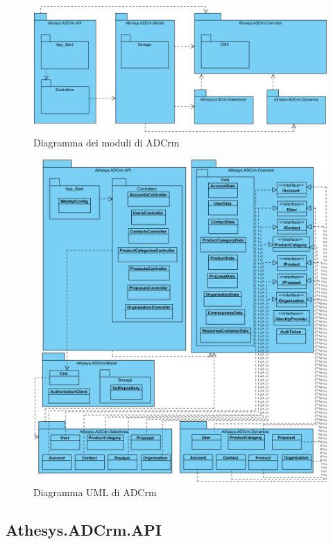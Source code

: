 \begin{figure}[H]
	\centering
	\includegraphics[width=\linewidth]{images/modulesDiagram}
	\caption{Diagramma dei moduli di ADCrm}
	\label{fig:generalUMLDiagram}
\end{figure}

\begin{figure}[H]
	\centering
	\includegraphics[width=\linewidth]{images/general2}
	\caption{Diagramma UML di ADCrm}
	\label{fig:modulesdiagram}
\end{figure}



\subsection{Athesys.ADCrm.API}

